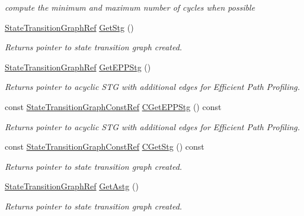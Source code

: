 \begin{DoxyCompactItemize}
\begin{DoxyCompactList}\small\item\em compute the minimum and maximum number of cycles when possible \end{DoxyCompactList}\item 
\hyperlink{state__transition__graph_8hpp_a50ba60cd5e113de254d5d7638bbbba86}{State\+Transition\+Graph\+Ref} \hyperlink{classStateTransitionGraphManager_a320b30fff409b26d2075dd4a028688db}{Get\+Stg} ()
\begin{DoxyCompactList}\small\item\em Returns pointer to state transition graph created. \end{DoxyCompactList}\item 
\hyperlink{state__transition__graph_8hpp_a50ba60cd5e113de254d5d7638bbbba86}{State\+Transition\+Graph\+Ref} \hyperlink{classStateTransitionGraphManager_a7f939e362163b1e4bb6308cc3f0bbfb7}{Get\+E\+P\+P\+Stg} ()
\begin{DoxyCompactList}\small\item\em Returns pointer to acyclic S\+TG with additional edges for Efficient Path Profiling. \end{DoxyCompactList}\item 
const \hyperlink{state__transition__graph_8hpp_aa722f3ba42caaaafcacdec07925f6b06}{State\+Transition\+Graph\+Const\+Ref} \hyperlink{classStateTransitionGraphManager_a1bc8860568f2b3038bfd26c0b30558d8}{C\+Get\+E\+P\+P\+Stg} () const
\begin{DoxyCompactList}\small\item\em Returns pointer to acyclic S\+TG with additional edges for Efficient Path Profiling. \end{DoxyCompactList}\item 
const \hyperlink{state__transition__graph_8hpp_aa722f3ba42caaaafcacdec07925f6b06}{State\+Transition\+Graph\+Const\+Ref} \hyperlink{classStateTransitionGraphManager_aa4d2fce9798ca435e2366e999d368c11}{C\+Get\+Stg} () const
\begin{DoxyCompactList}\small\item\em Returns pointer to state transition graph created. \end{DoxyCompactList}\item 
\hyperlink{state__transition__graph_8hpp_a50ba60cd5e113de254d5d7638bbbba86}{State\+Transition\+Graph\+Ref} \hyperlink{classStateTransitionGraphManager_af85011ea587c18b8b4f9356483fe84b3}{Get\+Astg} ()
\begin{DoxyCompactList}\small\item\em Returns pointer to state transition graph created. \end{DoxyCompactList}\item 

\end{DoxyCompactItemize}
